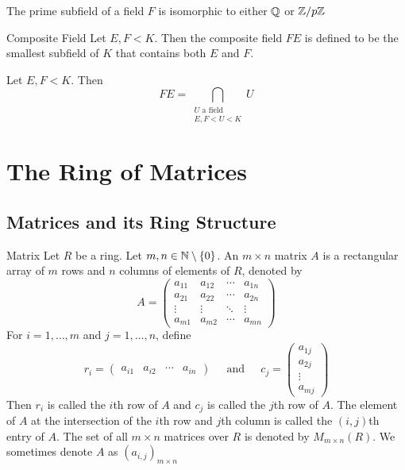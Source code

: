 \documentclass[a4paper]{article}
\begin{document}
\begin{prp}{}{} The prime subfield of a field $F$ is isomorphic to either $\mathbb{Q}$ or $\mathbb{Z}/p\mathbb{Z}$
\end{prp}

\begin{defn}{Composite Field}{} Let $E,F<K$. Then the composite field $FE$ is defined to be the smallest subfield of $K$ that contains both $E$ and $F$. 
\end{defn}

\begin{prp}{}{} Let $E,F<K$. Then $$FE=\bigcap_{\substack{U\text{ a field}\\E,F<U<K}}U$$
\end{prp}

\pagebreak
\section{The Ring of Matrices}
\subsection{Matrices and its Ring Structure}
\begin{defn}{Matrix}{} Let $R$ be a ring. Let $m,n\in\mathbb{N}\setminus\{0\}$. An $m\times n$ matrix $A$ is a rectangular array of $m$ rows and $n$ columns of elements of $R$, denoted by $$A=
\begin{pmatrix}
a_{11}&a_{12}&\cdots&a_{1n}\\
a_{21}&a_{22}&\cdots&a_{2n}\\
\vdots&\vdots&\ddots&\vdots\\
a_{m1}&a_{m2}&\cdots&a_{mn}
\end{pmatrix}$$ For $i=1,\dots,m$ and $j=1,\dots,n$, define $$r_i=
\begin{pmatrix}
a_{i1}&a_{i2}&\cdots&a_{in}
\end{pmatrix}\;\;\;\;\text{ and }\;\;\;\;c_j=\begin{pmatrix}
a_{1j}\\
a_{2j}\\
\vdots\\
a_{mj}
\end{pmatrix}$$ Then $r_i$ is called the $i$th row of $A$ and $c_j$ is called the $j$th row of $A$. The element of $A$ at the intersection of the $i$th row and $j$th column is called the $(i,j)$th entry of $A$. The set of all $m\times n$ matrices over $R$ is denoted by $M_{m\times n}(R)$. We sometimes denote $A$ as $(a_{i,j})_{m\times n}$
\end{defn}
\end{document}
